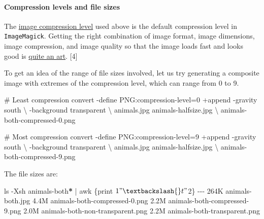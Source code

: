 \documentclass[
  11pt,
  british,
  a4paper,
]{article}
\newenvironment{Shaded}{\begin{snugshade}}{\end{snugshade}}
\newcommand{\AttributeTok}[1]{\textcolor[rgb]{0.80,0.80,0.80}{#1}}
\newcommand{\CommentTok}[1]{\textcolor[rgb]{0.50,0.62,0.50}{#1}}
\newcommand{\DataTypeTok}[1]{\textcolor[rgb]{0.87,0.87,0.75}{#1}}
\newcommand{\ExtensionTok}[1]{\textcolor[rgb]{0.80,0.80,0.80}{#1}}
\newcommand{\FunctionTok}[1]{\textcolor[rgb]{0.94,0.94,0.56}{#1}}
\newcommand{\KeywordTok}[1]{\textcolor[rgb]{0.94,0.87,0.69}{#1}}
\newcommand{\NormalTok}[1]{\textcolor[rgb]{0.80,0.80,0.80}{#1}}
\newcommand{\PreprocessorTok}[1]{\textcolor[rgb]{1.00,0.81,0.69}{\textbf{#1}}}
\newcommand{\StringTok}[1]{\textcolor[rgb]{0.80,0.58,0.58}{#1}}
\begin{document}
\hypertarget{compression-levels-and-file-sizes}{%
\paragraph{Compression levels and file
sizes}\label{compression-levels-and-file-sizes}}

The \href{https://en.wikipedia.org/wiki/Image_compression}{image
compression level} used above is the default compression level in
\texttt{ImageMagick}. Getting the right combination of image format,
image dimensions, image compression, and image quality so that the image
loads fast and looks good is
\href{https://www.smashingmagazine.com/2015/06/efficient-image-resizing-with-imagemagick/}{quite
an art}. {[}4{]}

To get an idea of the range of file sizes involved, let us try
generating a composite image with extremes of the compression level,
which can range from 0 to 9.

\begin{Shaded}
\begin{Highlighting}[]
\CommentTok{\# Least compression}
\ExtensionTok{convert} \AttributeTok{{-}define}\NormalTok{ PNG:compression{-}level=0 +append }\AttributeTok{{-}gravity}\NormalTok{ south }\DataTypeTok{\textbackslash{}}
\NormalTok{{-}background transparent }\DataTypeTok{\textbackslash{}}
\NormalTok{animals.jpg animals{-}halfsize.jpg }\DataTypeTok{\textbackslash{}}
\NormalTok{animals{-}both{-}compressed{-}0.png}

\CommentTok{\# Most compression}
\ExtensionTok{convert} \AttributeTok{{-}define}\NormalTok{ PNG:compression{-}level=9 +append }\AttributeTok{{-}gravity}\NormalTok{ south }\DataTypeTok{\textbackslash{}}
\NormalTok{{-}background transparent }\DataTypeTok{\textbackslash{}}
\NormalTok{animals.jpg animals{-}halfsize.jpg }\DataTypeTok{\textbackslash{}}
\NormalTok{animals{-}both{-}compressed{-}9.png}
\end{Highlighting}
\end{Shaded}

The file sizes are:

\begin{Shaded}
\begin{Highlighting}[]
\FunctionTok{ls} \AttributeTok{{-}Xsh}\NormalTok{ animals{-}both}\PreprocessorTok{*} \KeywordTok{|} \FunctionTok{awk} \StringTok{\textquotesingle{}\{print $1 "\textbackslash{}t" $2\}\textquotesingle{}}
\ExtensionTok{{-}{-}{-}}
\ExtensionTok{264K}\NormalTok{    animals{-}both.jpg}
\ExtensionTok{4.4M}\NormalTok{    animals{-}both{-}compressed{-}0.png}
\ExtensionTok{2.2M}\NormalTok{    animals{-}both{-}compressed{-}9.png}
\ExtensionTok{2.0M}\NormalTok{    animals{-}both{-}non{-}transparent.png}
\ExtensionTok{2.2M}\NormalTok{    animals{-}both{-}transparent.png}
\end{Highlighting}
\end{Shaded}
\end{document}
